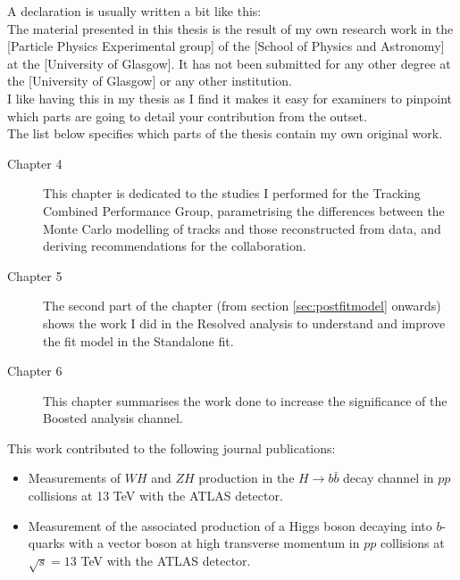 \documentclass[12pt,titlepage,oneside]{book}
\newcommand{\tcg}[1]{\textcolor{GRASSGREEN}{#1}} %
\newcommand{\Ra}{Resolved analysis }
\newcommand{\Ba}{Boosted analysis }
\begin{document}
\tcg{A declaration is usually written a bit like this:}\\

The material presented in this thesis is the result of my own research work in the [Particle Physics Experimental group] of the [School of Physics and Astronomy] at the [University of Glasgow]. It has not been submitted for any other degree at the [University of Glasgow] or any other institution.\\

\tcg{I like having this in my thesis as I find it makes it easy for examiners to pinpoint which parts are going to detail your contribution from the outset.}\\

The list below specifies which parts of the thesis contain my own original work.\\
\begin{description}
\item[Chapter 4] This chapter is dedicated to the studies I performed for the Tracking Combined Performance Group, parametrising the differences between the Monte Carlo modelling of tracks and those reconstructed from data, and deriving recommendations for the collaboration.
\item[Chapter 5] The second part of the chapter (from section \ref{sec:postfitmodel} onwards) shows the work I did in the \Ra to understand and improve the fit model in the \zlep Standalone fit.\smallskip
\item[Chapter 6] This chapter summarises the work done to increase the significance of the \Ba \tlep channel.
\end{description}

This work contributed to the following journal publications:
\begin{itemize}
\item[\cite{STXS2020Paper}] Measurements of $WH$ and $ZH$ production in the $H \rightarrow b\bar{b}$ decay channel in $pp$ collisions at 13 TeV with the ATLAS detector.
\item[\cite{Boosted2020Paper}] Measurement of the associated production of a Higgs boson decaying into $b$-quarks with a vector boson at high transverse momentum in $pp$ collisions at $\sqrt{s} = 13$ TeV with the ATLAS detector.
\end{itemize} 

\doublespacing

\mainmatter %
\linenumbers %
\end{document}
